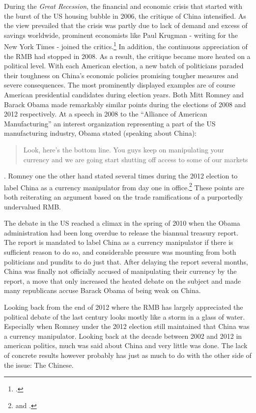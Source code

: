 During the \emph{Great Recession}, the financial and economic crisis 
that started with the burst of the US housing bubble in 2006, the 
critique of China intensified. As the view prevailed that the crisis was 
partly due to lack of demand and excess of savings worldwide, prominent 
economists like Paul Krugman - writing for the New York Times - joined 
the critics.\footnote{\cite{Krugman2009}.} In addition, the continuous 
appreciation of the RMB had stopped in 2008. As a result, the critique 
became more heated on a political level. With each American election, a 
new batch of politicians paraded their toughness on China's economic 
policies promising tougher measures and severe consequences. The most 
prominently displayed examples are of course American presidential 
candidates during election years.  Both Mitt Romney and Barack Obama 
made remarkably similar points during the elections of 2008 and 2012 
respectively. At a speech in 2008 to the ``Alliance of American 
Manufacturing'' an interest organization representing a part of the US 
manufacturing industry, Obama stated (speaking about China): 
\begin{quotation}Look, here's the bottom line.  You guys keep on 
	manipulating your currency and we are going start shutting off 
	access to some of our markets
\end{quotation}.  Romney one the other hand stated several times during 
the 2012 election to label China as a currency manipulator from day one 
in office.\footnote{\cite{Obama2008} and \cite{Romney2012}.} 
These points are both reiterating an argument based on the trade 
ramifications of a purportedly undervalued RMB.

The debate in the US reached a climax in the spring of 2010 when the 
Obama administration had been long overdue to release the biannual 
treasury report. The report is mandated to label China as a currency 
manipulator if there is sufficient reason to do so, and considerable 
pressure was mounting from both politicians and pundits to do just that.  
After delaying the report several months, China was finally not 
officially accused of manipulating their currency by the report, a move 
that only increased the heated debate on the subject and made many 
republicans accuse Barack Obama of being weak on China.

Looking back from the end of 2012 where the RMB has largely appreciated 
the political debate of the last century looks mostly like a storm in a 
glass of water. Especially when Romney under the 2012 election still 
maintained that China was a currency manipulator. Looking back at the 
decade between 2002 and 2012 in american politics, much was said about 
China and very little was done.  The lack of concrete results however 
probably has just as much to do with the other side of the issue: The 
Chinese.

